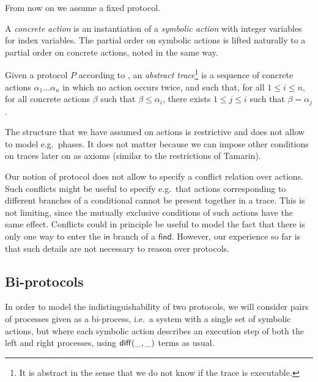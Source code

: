 From now on we assume a fixed protocol.

\begin{definition}
  A \emph{concrete action} is an instantiation of a \emph{symbolic action}
  with integer variables for index variables. The partial order on symbolic
  actions is lifted naturally to a partial order on concrete actions, noted
  in the same way.
\end{definition}

\begin{definition}
  \label{def:trace}
  Given a protocol $P$ according to ,
  an \emph{abstract trace}\footnote{
    It is abstract in the sense that we do not know if the trace
    is executable.} is a sequence of concrete actions
  $\alpha_1 \dots \alpha_n$
  in which no action occurs twice, and such that,
  for all $1 \leq i \leq n$,
  for all concrete actions $\beta$ such that $\beta \leq \alpha_i$,
  there exists $1 \leq j \leq i$ such that $\beta = \alpha_j$.
\end{definition}

\begin{remark}
  The structure that we have assumed on actions is restrictive and
  does not allow to model e.g.\ phases. It does not matter because we can
  impose other conditions on traces later on as axioms (similar to the
  restrictions of Tamarin).
\end{remark}

\begin{remark}
  Our notion of protocol does not allow to specify a conflict relation
  over actions. Such conflicts might be useful to specify e.g.\ that
  actions corresponding to different branches of a conditional cannot
  be present together in a trace. This is not limiting, since the
  mutually exclusive conditions of such actions have the same effect.
  Conflicts could in principle be useful to model the fact that there is only 
  one way to enter the $\mathsf{in}$ branch of a $\mathsf{find}$. However,
  our experience so far is that such details are not necessary to reason
  over protocols.
\end{remark}

\subsection{Bi-protocols}

In order to model the indistinguishability of two protocols, we will
consider pairs of processes given as a bi-process, i.e.\ a system with
a single set of symbolic actions, but where each symbolic action describes
an execution step of both the left and right processes,
using $\mathsf{diff}(\_,\_)$ terms as usual.

